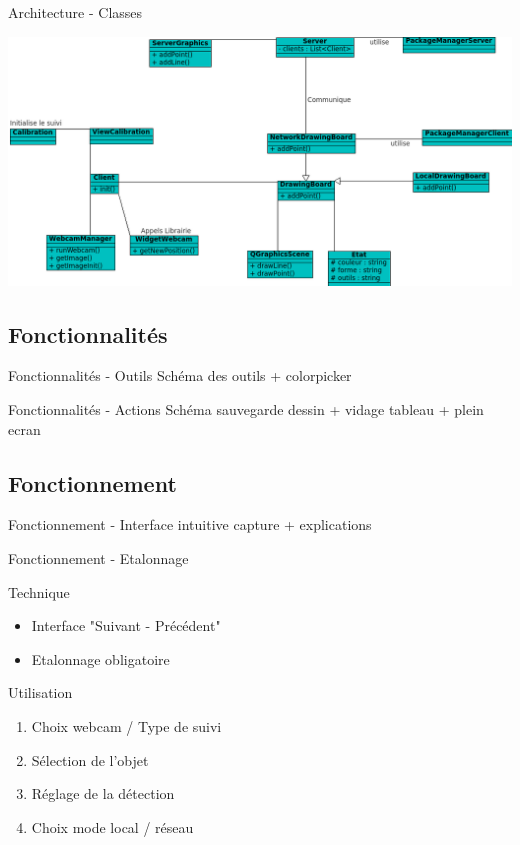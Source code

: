 \documentclass{beamer}
\begin{document}
		\begin{frame}{Architecture - Classes}
			\begin{center}		
				\includegraphics[scale=0.45]{../uml/classes.png}
			\end{center}
		\end{frame}
		
		\subsection{Fonctionnalités}
		\begin{frame}{Fonctionnalités - Outils}
			Schéma des outils + colorpicker
		\end{frame}
		\begin{frame}{Fonctionnalités - Actions}
			Schéma sauvegarde dessin + vidage tableau + plein ecran
		\end{frame}
		
		\subsection{Fonctionnement}
		\begin{frame}{Fonctionnement - Interface intuitive}
			capture + explications
		\end{frame}
		
		\begin{frame}{Fonctionnement - Etalonnage}
			\begin{block}{Technique}
				\begin{itemize}
					\item Interface "Suivant - Précédent"
					\item Etalonnage obligatoire
				\end{itemize}
			\end{block}
			\begin{block}{Utilisation}
				\begin{enumerate}
					\item Choix webcam / Type de suivi
					\item Sélection de l'objet
					\item Réglage de la détection
					\item Choix mode local / réseau
				\end{enumerate}
			\end{block}
			
		\end{frame}
		
\end{document}
